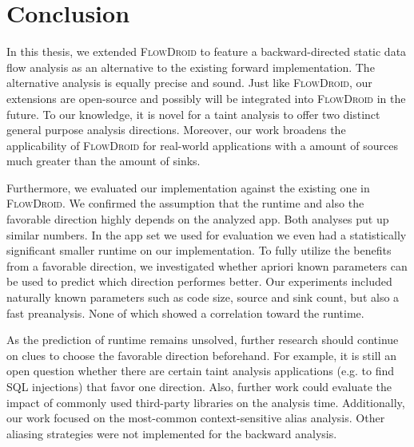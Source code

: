 \documentclass[../draft.tex]{subfiles}
\begin{document}
    \chapter{Conclusion}
    In this thesis, we extended \textsc{FlowDroid} to feature a backward-directed static data flow analysis as an alternative to the existing forward implementation. 
    The alternative analysis is equally precise and sound.
    Just like \textsc{FlowDroid}, our extensions are open-source and possibly will be integrated into \textsc{FlowDroid} in the future. 
    To our knowledge, it is novel for a taint analysis to offer two distinct general purpose analysis directions.
    Moreover, our work broadens the applicability of \textsc{FlowDroid} for real-world applications with a amount of sources much greater than the amount of sinks.

    Furthermore, we evaluated our implementation against the existing one in \textsc{FlowDroid}.
    We confirmed the assumption that the runtime and also the favorable direction highly depends on the analyzed app. 
    Both analyses put up similar numbers.
    In the app set we used for evaluation we even had a statistically significant smaller runtime on our implementation. 
    To fully utilize the benefits from a favorable direction, we investigated whether apriori known parameters can be used to predict which direction performes better. 
    Our experiments included naturally known parameters such as code size, source and sink count, but also a fast preanalysis. 
    None of which showed a correlation toward the runtime.

    As the prediction of runtime remains unsolved, further research should continue on clues to choose the favorable direction beforehand.
    For example, it is still an open question whether there are certain taint analysis applications (e.g. to find SQL injections) that favor one direction. 
    Also, further work could evaluate the impact of commonly used third-party libraries on the analysis time.
    Additionally, our work focused on the most-common context-sensitive alias analysis. 
    Other aliasing strategies were not implemented for the backward analysis.
\end{document}
